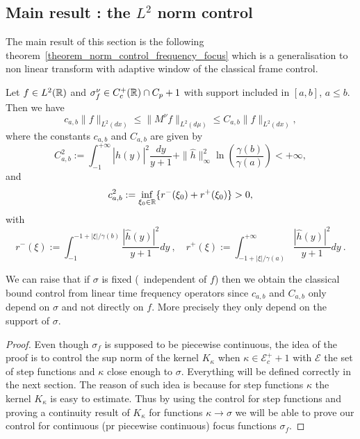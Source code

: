 \subsection{Main result : the $L^2$ norm control}\label{ssection_norm_control_frequency_focus}

The main result of this section is the following theorem~\ref{theorem_norm_control_frequency_focus} which is a generalisation to non linear transform with adaptive window of the classical frame control.
\begin{theorem}\label{theorem_norm_control_frequency_focus}
	Let $f\in L^2(\mathbb{R})$ and $\sigma^\nu_f\in C_c^+(\mathbb{R})\cap C_p+1$ with support included in $[a,b]$, $a\leqslant b$. Then we have
	\begin{equation}
		c_{a,b}\|f\|_{L^2(dx)} \leqslant \|M^\nu f \|_{L^2(d\mu)} \leqslant C_{a,b}\|f\|_{L^2(dx)},
	\end{equation}
	where the constants $c_{a,b}$ and $C_{a,b}$ are given by
	\begin{equation}
		C_{a,b}^2 := \int_{-1}^{+\infty}|\hat{h}(y)|^2 \frac{dy}{y+1} + \|\hat{h}\|_{\infty}^2\ln\left(\frac{\gamma(b)}{\gamma(a)}\right) < + \infty,
	\end{equation}
	and
	\begin{equation}
		c_{a,b}^2 := \inf_{\xi_0\in\mathbb{R}}\{r^-(\xi_0) + r^+(\xi_0) \} >0,
	\end{equation}
	with
	\begin{equation}
		r^-(\xi):= \int_{-1}^{-1+|\xi|/\gamma(b)}\frac{|\hat{h}(y)|^2}{y+1}dy \  , \quad r^+(\xi):= \int_{-1+|\xi|/\gamma(a)}^{+\infty}\frac{|\hat{h}(y)|^2}{y+1}dy\ .
	\end{equation}
\end{theorem}

\begin{remark}
	We can raise that if $\sigma$ is fixed (\ie\, independent of $f$) then we obtain the classical bound control from linear time frequency operators since $c_{a,b}$ and $C_{a,b}$ only depend on $\sigma$ and not directly on $f$. More precisely they only depend on the support of $\sigma$.
\end{remark}

\begin{proof}
	Even though $\sigma_f$ is supposed to be piecewise continuous, the idea of the proof is to control the sup norm of the kernel $K_\kappa$ when $\kappa \in \mathcal{E}_c^+ +1$ with $\mathcal{E}$ the set of step functions and $\kappa$ close enough to $\sigma$. Everything will be defined correctly in the next section. The reason of such idea is because for step functions $\kappa$ the kernel $K_\kappa$ is easy to estimate. Thus by using the control for step functions and proving a continuity result of $K_\kappa$ for functions $\kappa\rightarrow \sigma$ we will be able to prove our control for continuous (pr piecewise continuous) focus functions $\sigma_f$.
\end{proof}

